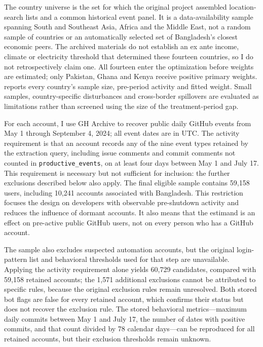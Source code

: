 The country universe is the set for which the original project assembled location-search lists and a common historical event panel. It is a data-availability sample spanning South and Southeast Asia, Africa and the Middle East, not a random sample of countries or an automatically selected set of Bangladesh's closest economic peers. The archived materials do not establish an ex ante income, climate or electricity threshold that determined these fourteen countries, so I do not retrospectively claim one. All fourteen enter the optimization before weights are estimated; only Pakistan, Ghana and Kenya receive positive primary weights.  reports every country's sample size, pre-period activity and fitted weight. Small samples, country-specific disturbances and cross-border spillovers are evaluated as limitations rather than screened using the size of the treatment-period gap.

For each account, I use GH Archive to recover public daily GitHub events from May 1 through September 4, 2024; all event dates are in UTC. The activity requirement is that an account records any of the nine event types retained by the extraction query, including issue comments and commit comments not counted in \texttt{productive\_events}, on at least four days between May 1 and July 17. This requirement is necessary but not sufficient for inclusion: the further exclusions described below also apply. The final eligible sample contains 59,158 users, including 10,241 accounts associated with Bangladesh. This restriction focuses the design on developers with observable pre-shutdown activity and reduces the influence of dormant accounts. It also means that the estimand is an effect on pre-active public GitHub users, not on every person who has a GitHub account.

The sample also excludes suspected automation accounts, but the original login-pattern list and behavioral thresholds used for that step are unavailable. Applying the activity requirement alone yields 60,729 candidates, compared with 59,158 retained accounts; the 1,571 additional exclusions cannot be attributed to specific rules, because the original exclusion rules remain unresolved. Both stored bot flags are false for every retained account, which confirms their status but does not recover the exclusion rule. The stored behavioral metrics---maximum daily commits between May 1 and July 17, the number of dates with positive commits, and that count divided by 78 calendar days---can be reproduced for all retained accounts, but their exclusion thresholds remain unknown.

